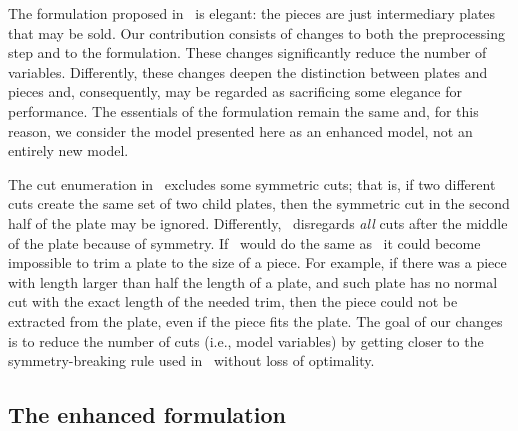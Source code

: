 \documentclass[smallextended]{svjour3}       %
\begin{document}
The formulation proposed in~\cite{furini:2016} is elegant: the pieces are just intermediary plates that may be sold.
Our contribution consists of changes to both the preprocessing step and to the formulation.
These changes significantly reduce the number of variables.
Differently, these changes deepen the distinction between plates and pieces and, consequently, may be regarded as sacrificing some elegance for performance.
The essentials of the formulation remain the same and, for this reason, we consider the model presented here as an enhanced model, not an entirely new model.


The cut enumeration in~\cite{furini:2016} excludes some symmetric cuts; that is, if two different cuts create the same set of two child plates, then the symmetric cut in the second half of the plate may be ignored.
Differently,~\cite{nicos:1977} disregards \emph{all} cuts after the middle of the plate because of symmetry.
If~\cite{furini:2016} would do the same as~\cite{nicos:1977} it could become impossible to trim a plate to the size of a piece.
For example, if there was a piece with length larger than half the length of a plate, and such plate has no normal cut with the exact length of the needed trim, then the piece could not be extracted from the plate, even if the piece fits the plate.
The goal of our changes is to reduce the number of cuts (i.e., model variables) by getting closer to the symmetry-breaking rule used in~\cite{nicos:1977} without loss of optimality.


\subsection{The enhanced formulation}
\label{sec:enhanced}
\end{document}
